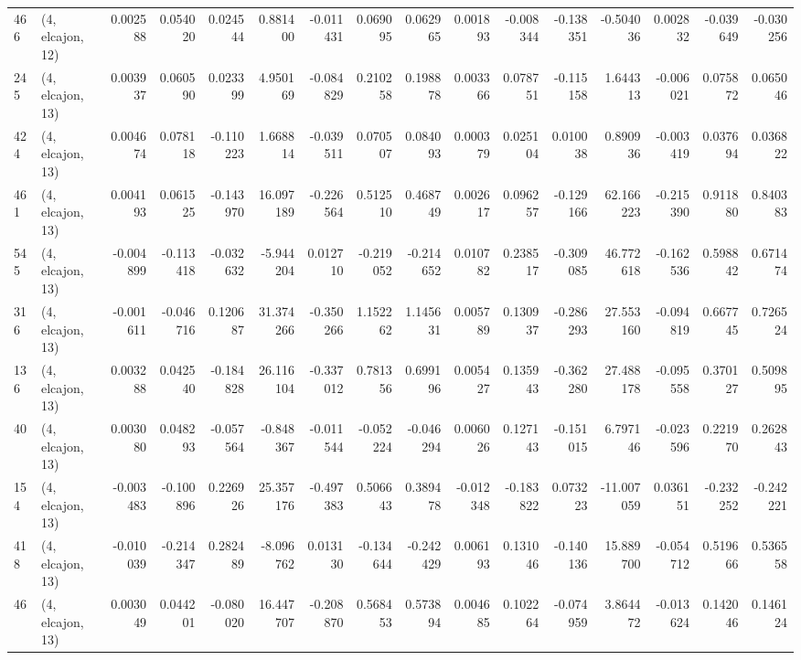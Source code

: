 \begin{tabular}{llrrrrrrrrrrrrrr}
466 &  (4, elcajon, 12) &   0.002588 &  0.054020 &  0.024544 &    0.881400 & -0.011431 &   0.069095 &  0.062965 &  0.001893 & -0.008344 & -0.138351 &   -0.504036 &  0.002832 & -0.039649 & -0.030256 \\
245 &  (4, elcajon, 13) &   0.003937 &  0.060590 &  0.023399 &    4.950169 & -0.084829 &   0.210258 &  0.198878 &  0.003366 &  0.078751 & -0.115158 &    1.644313 & -0.006021 &  0.075872 &  0.065046 \\
424 &  (4, elcajon, 13) &   0.004674 &  0.078118 & -0.110223 &    1.668814 & -0.039511 &   0.070507 &  0.084093 &  0.000379 &  0.025104 &  0.010038 &    0.890936 & -0.003419 &  0.037694 &  0.036822 \\
461 &  (4, elcajon, 13) &   0.004193 &  0.061525 & -0.143970 &   16.097189 & -0.226564 &   0.512510 &  0.468749 &  0.002617 &  0.096257 & -0.129166 &   62.166223 & -0.215390 &  0.911880 &  0.840383 \\
545 &  (4, elcajon, 13) &  -0.004899 & -0.113418 & -0.032632 &   -5.944204 &  0.012710 &  -0.219052 & -0.214652 &  0.010782 &  0.238517 & -0.309085 &   46.772618 & -0.162536 &  0.598842 &  0.671474 \\
316 &  (4, elcajon, 13) &  -0.001611 & -0.046716 &  0.120687 &   31.374266 & -0.350266 &   1.152262 &  1.145631 &  0.005789 &  0.130937 & -0.286293 &   27.553160 & -0.094819 &  0.667745 &  0.726524 \\
136 &  (4, elcajon, 13) &   0.003288 &  0.042540 & -0.184828 &   26.116104 & -0.337012 &   0.781356 &  0.699196 &  0.005427 &  0.135943 & -0.362280 &   27.488178 & -0.095558 &  0.370127 &  0.509895 \\
40  &  (4, elcajon, 13) &   0.003080 &  0.048293 & -0.057564 &   -0.848367 & -0.011544 &  -0.052224 & -0.046294 &  0.006026 &  0.127143 & -0.151015 &    6.797146 & -0.023596 &  0.221970 &  0.262843 \\
154 &  (4, elcajon, 13) &  -0.003483 & -0.100896 &  0.226926 &   25.357176 & -0.497383 &   0.506643 &  0.389478 & -0.012348 & -0.183822 &  0.073223 &  -11.007059 &  0.036151 & -0.232252 & -0.242221 \\
418 &  (4, elcajon, 13) &  -0.010039 & -0.214347 &  0.282489 &   -8.096762 &  0.013130 &  -0.134644 & -0.242429 &  0.006193 &  0.131046 & -0.140136 &   15.889700 & -0.054712 &  0.519666 &  0.536558 \\
46  &  (4, elcajon, 13) &   0.003049 &  0.044201 & -0.080020 &   16.447707 & -0.208870 &   0.568453 &  0.573894 &  0.004685 &  0.102264 & -0.074959 &    3.864472 & -0.013624 &  0.142046 &  0.146124 \\

\end{tabular}
